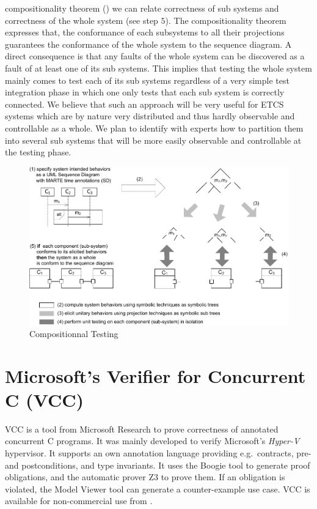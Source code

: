 compositionality theorem (\cite{bannour2012}) we can relate
correctness of sub systems and correctness of the whole system (see
step $5$).  The compositionality theorem expresses that, the
conformance of each subsystems to all their projections guarantees the
conformance of the whole system to the sequence diagram. A direct
consequence is that any faults of the whole system can be discovered
as a fault of at least one of its sub systems. This implies that
testing the whole system mainly comes to test each of its sub systems
regardless of a very simple test integration phase in which one only
tests that each sub system is correctly connected. We believe that
such an approach will be very useful for ETCS systems which are by
nature very distributed and thus hardly observable and controllable as
a whole. We plan to identify with experts how to partition them into
several sub systems that will be more easily observable and
controllable at the testing phase.


\begin{figure}
\centering
\includegraphics[scale=0.525]{approach_3.pdf}
\caption{\label{ct}Compositionnal Testing}
\end{figure}








\section{Microsoft's Verifier for Concurrent C (VCC)}

VCC is a tool from Microsoft Research
to prove correctness of annotated concurrent C programs.
It was mainly developed to verify Microsoft's \emph{Hyper-V} hypervisor.
%
It supports an own annotation language providing
e.g.\ contracts, pre- and postconditions, and type invariants.
%
It uses the Boogie tool to generate proof obligations,
and the automatic prover Z3 to prove them.
%
If an obligation is violated, the Model Viewer tool can generate a
counter-example use case.
%
VCC is available for non-commercial use from \cite{vcc}.


